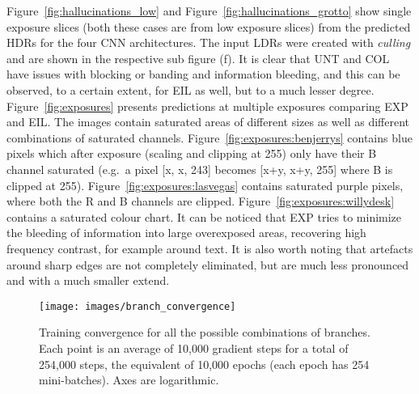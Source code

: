 \documentclass{egpubl}
\newcommand{\tc}[1]{{#1}}
\begin{document}
Figure~\ref{fig:hallucinations_low} and Figure~\ref{fig:hallucinations_grotto}
show single exposure slices (both these cases are from low exposure slices) from the predicted HDRs for the four CNN
architectures. The input LDRs were created with \textit{culling} and are shown in the respective sub figure (f). It is clear
that UNT and COL have issues with blocking or banding and information bleeding, and this
can be observed, to a certain extent, for EIL as well, but to a much lesser degree.
\tc{Figure~\ref{fig:exposures} presents predictions at multiple exposures
comparing EXP and EIL. The images contain saturated areas of different
sizes as well as different combinations of saturated channels.
Figure~\ref{fig:exposures:benjerrys} contains blue pixels which after exposure
(scaling and clipping at 255) only have their B channel saturated (e.g.\ a pixel
[x, x, 243] becomes [x+y, x+y, 255] where B is clipped at 255).
Figure~\ref{fig:exposures:lasvegas} contains saturated purple pixels, where
both the R and B channels are clipped. Figure~\ref{fig:exposures:willydesk}
contains a saturated colour chart. It can be noticed that EXP tries to
minimize the bleeding of information into large overexposed areas, recovering
high frequency contrast, for example around text. It is also worth noting that
artefacts around sharp edges are not completely eliminated, but are much less
pronounced and with a much smaller extend.}

\begin{figure}[htb]
    \centering
    \texttt{[image: images/branch\_convergence]}
    \caption{\tc{Training convergence for all the possible combinations of
    branches. Each point is an average of 10,000 gradient steps for a total of
    254,000 steps, the equivalent of 10,000 epochs (each epoch has 254
    mini-batches). Axes are logarithmic.}}\label{fig:branch_conv}
\end{figure}
\end{document}
